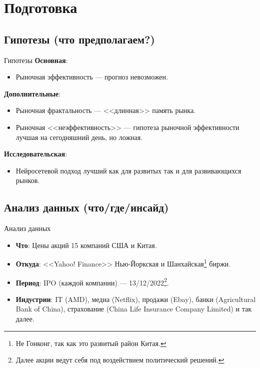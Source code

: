 \documentclass[11pt, aspectratio= 169]{beamer}
\begin{document}
	\section{Подготовка}
	\subsection{Гипотезы (что предполагаем?)}
	\begin{frame}{Гипотезы}
		\large
		\textbf{Основная}:
		\begin{itemize}
			\item Рыночная эффективность \cite{fama1970efficient} --- прогноз невозможен.
		\end{itemize}
		
		\textbf{Дополнительные}:
		\begin{itemize}
			\item Рыночная фрактальность \cite{mandelbrot2006misbehavior} --- <<длинная>> память рынка.
			\item Рыночная <<неэффективность>> \cite{matrin2011history} --- гипотеза рыночной эффективности лучшая на сегодняшний день, но ложная.
		\end{itemize}
	
		\textbf{Исследовательская}:
		\begin{itemize}
			\item Нейросетевой подход лучший как для развитых так и для развивающихся рынков. 
		\end{itemize}
	\end{frame}
	
	\subsection{Анализ данных (что/где/инсайд)}
	\begin{frame}{Анализ данных}
		\Large
		\begin{itemize}
			\item[] \textbf{Что}: Цены акций 15 компаний США и Китая.
			\item[] \textbf{Откуда}: <<Yahoo! Finance>> Нью-Йоркская и Шанхайская\footnote{Не Гонконг, так как это развитый район Китая.} биржи.
			\item[] \textbf{Период}: IPO (каждой компании) --- 13/12/2022\footnote{Далее акции ведут себя под воздействием политический решений.}.
			\item[] \textbf{Индустрии}: IT (AMD), медиа (Netflix), продажи (Ebay), банки (Agricultural Bank of China), страхование (China Life Insurance Company Limited) и так далее.
		\end{itemize}
	\end{frame}
\end{document}
